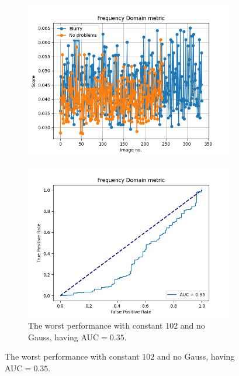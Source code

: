 \begin{figure}[H]
    \centering
    \begin{subfigure}[t]{0.48\textwidth}
        \includegraphics[width=\textwidth]{Figures/BlurredImages/tweakFM/102_output_basic_no_gauss.png}
        \caption{}
        \label{fig:FM_basic_102}
    \end{subfigure}\hspace{1em}
    \begin{subfigure}[t]{0.48\textwidth}
        \includegraphics[width=\textwidth]{Figures/BlurredImages/tweakFM/102_output_roc_no_gauss.png}
        \caption{The worst performance with constant $102$ and no Gauss, having AUC$=0.35$.}
        \label{fig:FM_roc_102}
    \end{subfigure}\hspace{1em}

\end{figure}
